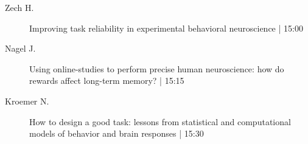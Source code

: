 \begin{symposium}
\begin{description}
                \item [ Zech H.] Improving task reliability in experimental behavioral neuroscience \textcolor{mygray}{ | 15:00}    
                
                \item [ Nagel J.] Using online-studies to perform precise human neuroscience: how do rewards affect long-term memory? \textcolor{mygray}{ | 15:15}    
                
                \item [ Kroemer N.] How to design a good task: lessons from statistical and computational models of behavior and brain responses \textcolor{mygray}{ | 15:30}    
                
            \end{description} 
            \end{symposium}
            